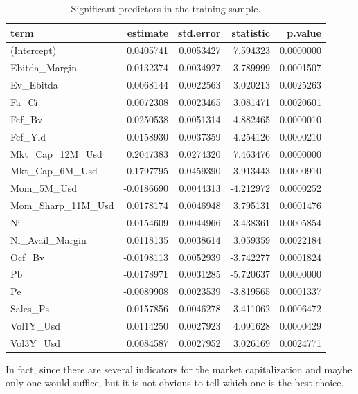 \documentclass[]{krantz}
\theoremstyle{definition}
\theoremstyle{definition}
\theoremstyle{definition}
\theoremstyle{remark}
\begin{document}
\begin{table}[t]

\caption{\label{tab:regbroom}Significant predictors in the training sample.}
\centering
\begin{tabular}{lrrrr}
\toprule
term & estimate & std.error & statistic & p.value\\
\midrule
(Intercept) & 0.0405741 & 0.0053427 & 7.594323 & 0.0000000\\
Ebitda\_Margin & 0.0132374 & 0.0034927 & 3.789999 & 0.0001507\\
Ev\_Ebitda & 0.0068144 & 0.0022563 & 3.020213 & 0.0025263\\
Fa\_Ci & 0.0072308 & 0.0023465 & 3.081471 & 0.0020601\\
Fcf\_Bv & 0.0250538 & 0.0051314 & 4.882465 & 0.0000010\\
\addlinespace
Fcf\_Yld & -0.0158930 & 0.0037359 & -4.254126 & 0.0000210\\
Mkt\_Cap\_12M\_Usd & 0.2047383 & 0.0274320 & 7.463476 & 0.0000000\\
Mkt\_Cap\_6M\_Usd & -0.1797795 & 0.0459390 & -3.913443 & 0.0000910\\
Mom\_5M\_Usd & -0.0186690 & 0.0044313 & -4.212972 & 0.0000252\\
Mom\_Sharp\_11M\_Usd & 0.0178174 & 0.0046948 & 3.795131 & 0.0001476\\
\addlinespace
Ni & 0.0154609 & 0.0044966 & 3.438361 & 0.0005854\\
Ni\_Avail\_Margin & 0.0118135 & 0.0038614 & 3.059359 & 0.0022184\\
Ocf\_Bv & -0.0198113 & 0.0052939 & -3.742277 & 0.0001824\\
Pb & -0.0178971 & 0.0031285 & -5.720637 & 0.0000000\\
Pe & -0.0089908 & 0.0023539 & -3.819565 & 0.0001337\\
\addlinespace
Sales\_Ps & -0.0157856 & 0.0046278 & -3.411062 & 0.0006472\\
Vol1Y\_Usd & 0.0114250 & 0.0027923 & 4.091628 & 0.0000429\\
Vol3Y\_Usd & 0.0084587 & 0.0027952 & 3.026169 & 0.0024771\\
\bottomrule
\end{tabular}
\end{table}

\normalsize

In fact, since there are several indicators for the market
capitalization and maybe only one would suffice, but it is not obvious
to tell which one is the best choice.
\end{document}
